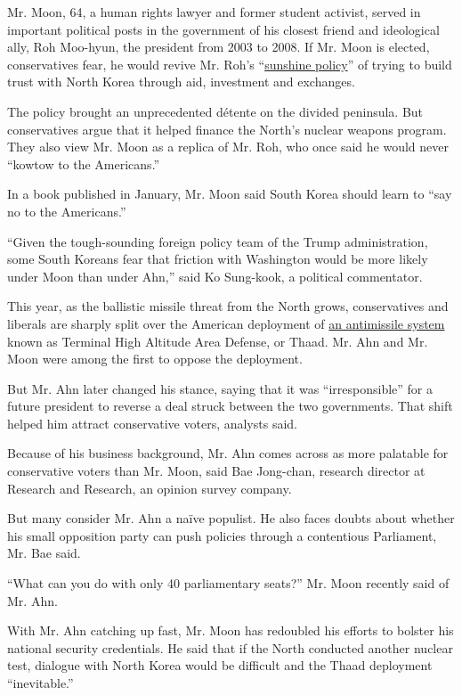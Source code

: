 Mr. Moon, 64, a human rights lawyer and former student activist, served
in important political posts in the government of his closest friend and
ideological ally, Roh Moo-hyun, the president from 2003 to 2008. If Mr.
Moon is elected, conservatives fear, he would revive Mr. Roh's
``\href{http://www.nytimes.com/2008/01/17/world/asia/17korea.html}{sunshine
policy}'' of trying to build trust with North Korea through aid,
investment and exchanges.

The policy brought an unprecedented détente on the divided peninsula.
But conservatives argue that it helped finance the North's nuclear
weapons program. They also view Mr. Moon as a replica of Mr. Roh, who
once said he would never ``kowtow to the Americans.''

In a book published in January, Mr. Moon said South Korea should learn
to ``say no to the Americans.''

``Given the tough-sounding foreign policy team of the Trump
administration, some South Koreans fear that friction with Washington
would be more likely under Moon than under Ahn,'' said Ko Sung-kook, a
political commentator.

This year, as the ballistic missile threat from the North grows,
conservatives and liberals are sharply split over the American
deployment of
\href{https://www.nytimes.com/2017/03/06/world/asia/north-korea-thaad-missile-defense-us-china.html}{an
antimissile system} known as Terminal High Altitude Area Defense, or
Thaad. Mr. Ahn and Mr. Moon were among the first to oppose the
deployment.

But Mr. Ahn later changed his stance, saying that it was
``irresponsible'' for a future president to reverse a deal struck
between the two governments. That shift helped him attract conservative
voters, analysts said.

Because of his business background, Mr. Ahn comes across as more
palatable for conservative voters than Mr. Moon, said Bae Jong-chan,
research director at Research and Research, an opinion survey company.

But many consider Mr. Ahn a naïve populist. He also faces doubts about
whether his small opposition party can push policies through a
contentious Parliament, Mr. Bae said.

``What can you do with only 40 parliamentary seats?'' Mr. Moon recently
said of Mr. Ahn.

With Mr. Ahn catching up fast, Mr. Moon has redoubled his efforts to
bolster his national security credentials. He said that if the North
conducted another nuclear test, dialogue with North Korea would be
difficult and the Thaad deployment ``inevitable.''

